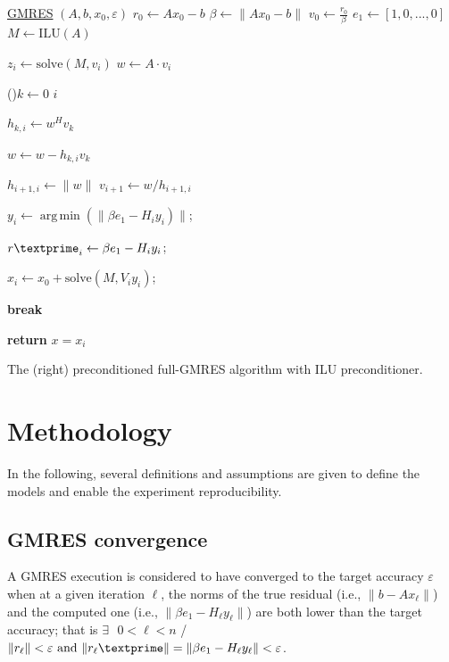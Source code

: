 \documentclass[twoside]{article}
\DeclareMathOperator*{\argmin}{arg\,min}
\begin{document}
\begin{algorithm}
  
  \underline{GMRES} $(A, b, x_0, \varepsilon)$\;
  $r_0 \leftarrow Ax_0 - b$\;
  $ \beta \leftarrow \|  Ax_0 - b \|$\;
  $v_0 \leftarrow \frac{r_0}{\beta}$\;
  $e_1 \leftarrow [1, 0,..., 0]$\;
  $M \leftarrow \text{ILU}(A)$\;
  {
    $z_i \leftarrow \text{solve}(M, v_i)$ 
    $w \leftarrow A \cdot v_i$ 
    
    \For(){$k\leftarrow 0$ \KwTo $i$} 
    {
      $h_{k,i} \leftarrow w^H v_k $ 
      
      $w \leftarrow w - h_{k, i} v_k$ 
    }
    $h_{i+1, i} \leftarrow \|w\|$\;
    $v_{i+1} \leftarrow w / h_{i+1, i}$ \; 
    
    $y_i \leftarrow \argmin(\| \beta e_1 - H_i y_i)\|$;
    
    $r\textprime_{i} \leftarrow \beta e_1 - H_i y_i$;
    
    
    {
      $x_i \leftarrow x_0 +  \text{solve}(M, V_i y_i)$;
      
      \textbf{break}
    }{}
  }  
  
  
  \textbf{return} $x = x_i$\;
  \caption{The (right) preconditioned full-GMRES algorithm with ILU preconditioner.}\label{alg:precond-gmres}
\end{algorithm}

\section{Methodology}
In the following, several definitions and assumptions are given to define the models and enable the experiment reproducibility.
\subsection{GMRES convergence}
A GMRES execution is considered to have converged to the target accuracy $\varepsilon$ when at a given iteration $\ell$, the norms of the
true residual (i.e., $\|b-Ax_\ell\|$) and the computed one (i.e., $\| \beta e_1 - H_\ell y_\ell\|$) are both lower than the target accuracy;
that is  $\exists \text{ } 0 < \ell < n$ / $\|r_{\ell}\| < \varepsilon \text{ and } \|r_{\ell}\textprime\| = \| \beta e_1 - H_\ell y_\ell\| < \varepsilon$. 
\end{document}

